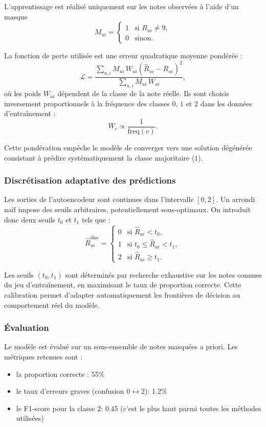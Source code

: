 \documentclass[11pt,a4paper]{article}
\begin{document}
L’apprentissage est réalisé uniquement sur les notes observées à l’aide d’un masque
\[
M_{ui} =
\begin{cases}
1 & \text{si } R_{ui} \neq 9,\\
0 & \text{sinon}.
\end{cases}
\]

La fonction de perte utilisée est une erreur quadratique moyenne pondérée :
\[
\mathcal{L} =
\frac{\sum_{u,i} M_{ui} \, W_{ui} \left(\hat{R}_{ui} - R_{ui}\right)^2}
{\sum_{u,i} M_{ui} \, W_{ui}},
\]
où les poids $W_{ui}$ dépendent de la classe de la note réelle.  
Ils sont choisis inversement proportionnels à la fréquence des classes $0$, $1$ et $2$ dans les données d’entraînement :
\[
W_c \propto \frac{1}{\mathrm{freq}(c)}.
\]

Cette pondération empêche le modèle de converger vers une solution dégénérée consistant à prédire systématiquement la classe majoritaire ($1$).




\subsubsection{Discrétisation adaptative des prédictions}

Les sorties de l’autoencodeur sont continues dans l’intervalle $[0,2]$.  
Un arrondi naïf impose des seuils arbitraires, potentiellement sous-optimaux.  
On introduit donc deux seuils $t_0$ et $t_1$ tels que :
\[
\hat{R}_{ui}^{\text{disc}} =
\begin{cases}
0 & \text{si } \hat{R}_{ui} < t_0,\\
1 & \text{si } t_0 \le \hat{R}_{ui} < t_1,\\
2 & \text{si } \hat{R}_{ui} \ge t_1.
\end{cases}
\]

Les seuils $(t_0,t_1)$ sont déterminés par recherche exhaustive sur les notes connues du jeu d’entraînement, en maximisant le taux de proportion correcte.  
Cette calibration permet d’adapter automatiquement les frontières de décision au comportement réel du modèle.

\subsubsection{Évaluation}

Le modèle est évalué sur un sous-ensemble de notes masquées a priori.  
Les métriques retenues sont :
\begin{itemize}
    \item la proportion correcte : 55\%
    \item le taux d’erreurs graves (confusion $0 \leftrightarrow 2$): 1.2\%
    \item le F1-score pour la classe $2$: 0.45 (c'est le plus haut parmi toutes les méthodes utilisées)
\end{itemize}
\end{document}
